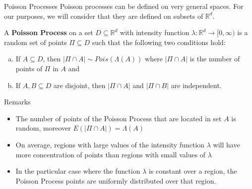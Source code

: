 \documentclass[8pt]{beamer}
\begin{document}
\begin{frame}{Poisson Processes}
Poisson processes can be defined on very general spaces. For our purposes, we will consider that they are defined on subsets of $ \mathbb{R}^d$. 

\vspace{3mm}

A \textbf{Poisson Process} on a set $D \subseteq \mathbb{R}^d $ with intensity function $\lambda: \mathbb{R}^d \longrightarrow [0,\infty)$ is a random set of points $\Pi \subseteq D$ such that the following two conditions hold:

\begin{enumerate}[a.]
	\item If $A \subseteq D$, then $|\Pi \cap A| \sim Pois (\Lambda(A))$ where $|\Pi \cap A|$ is the number of points of $\Pi$ in $A$ and
	\item If $A, B \subseteq D$ are disjoint, then $|\Pi \cap A|$ and $|\Pi \cap B|$ are independent.
\end{enumerate}
\end{frame}

\begin{frame}{Remarks}
\begin{itemize}
	\item The number of points of the Poisson Process that are located in set $A$ is random, moreover $E(|\Pi \cap A|)=\Lambda(A)$
	\item On average, regions with large values of the intensity function $\lambda$ will have more concentration of points than regions with small values of $\lambda$
	\item In the particular case where the function $\lambda$ is constant over a region, the Poisson Process points are uniformly distributed over that region.
\end{itemize}
\end{frame}
\end{document}
